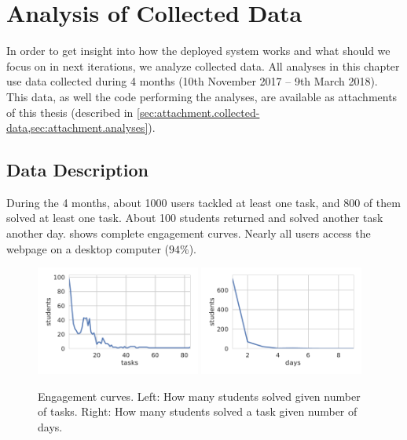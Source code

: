 \chapter{Analysis of Collected Data}
\label{chap:analysis}


In order to get insight into how the deployed system works
and what should we focus on in next iterations,
we analyze collected data.
All analyses in this chapter use data collected  %
during 4 months (10th November 2017 -- 9th March 2018).
This data, as well the code performing the analyses, are available
as attachments of this thesis
(described in \cref{sec:attachment.collected-data,sec:attachment.analyses}).


\section{Data Description}

During the 4 months, about 1000 users tackled at least one task,
and 800 of them solved at least one task.
About 100 students returned and solved another task another day.
 shows complete engagement curves.
Nearly all users access the webpage on a desktop computer ($94\%$).

\begin{figure}[htb]
\centering
\includegraphics[width=0.48\textwidth]{img/engagement-tasks}
\includegraphics[width=0.48\textwidth]{img/engagement-days}
\caption{%
  Engagement curves.
  Left: How many students solved given number of tasks.
  Right: How many students solved a task given number of days.}
\label{fig:engagement-curves}
\end{figure}


